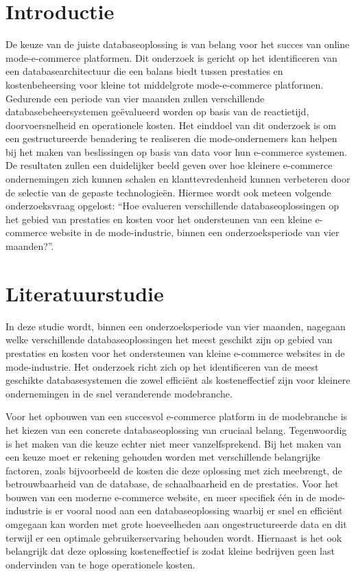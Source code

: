 
\section{Introductie}%
\label{sec:introductie}

De keuze van de juiste databaseoplossing is van belang voor het succes van online mode-e-commerce platformen. Dit onderzoek is gericht op het identificeren van een databasearchitectuur die een balans biedt tussen prestaties en kostenbeheersing voor kleine tot middelgrote mode-e-commerce platformen. Gedurende een periode van vier maanden zullen verschillende databasebeheersystemen geëvalueerd worden op basis van de reactietijd, doorvoersnelheid en operationele kosten. Het einddoel van dit onderzoek is om een gestructureerde benadering te realiseren die mode-ondernemers kan helpen bij het maken van beslissingen op basis van data voor hun e-commerce systemen. De resultaten zullen een duidelijker beeld geven over hoe kleinere e-commerce ondernemingen zich kunnen schalen en klanttevredenheid kunnen verbeteren door de selectie van de gepaste technologieën. Hiermee wordt ook meteen volgende onderzoeksvraag opgelost: ``Hoe evalueren verschillende databaseoplossingen op het gebied van prestaties en kosten voor het ondersteunen van een kleine e-commerce website in de mode-industrie, binnen een onderzoeksperiode van vier maanden?''.


\section{Literatuurstudie}%
\label{sec:literatuurstudie}
In deze studie wordt, binnen een onderzoeksperiode van vier maanden, nagegaan welke
verschillende databaseoplossingen het meest geschikt zijn op gebied van prestaties en kosten voor
het ondersteunen van kleine e-commerce websites in de mode-industrie. Het onderzoek richt zich op
het identificeren van de meest geschikte databasesystemen die zowel efficiënt als kosteneffectief
zijn voor kleinere ondernemingen in de snel veranderende modebranche.

Voor het opbouwen van een succesvol e-commerce platform in de modebranche is het kiezen van
een concrete databaseoplossing van cruciaal belang. Tegenwoordig is het maken van die keuze
echter niet meer vanzelfsprekend. Bij het maken van een keuze moet er rekening gehouden worden
met verschillende belangrijke factoren, zoals bijvoorbeeld de kosten die deze oplossing met zich
meebrengt, de betrouwbaarheid van de database, de schaalbaarheid en de prestaties. Voor het
bouwen van een moderne e-commerce website, en meer specifiek één in de mode-industrie is er
vooral nood aan een databaseoplossing waarbij er snel en efficiënt omgegaan kan worden met grote
hoeveelheden aan ongestructureerde data en dit terwijl er een optimale gebruikerservaring
behouden wordt. Hiernaast is het ook belangrijk dat deze oplossing kosteneffectief is zodat kleine
bedrijven geen last ondervinden van te hoge operationele kosten.

